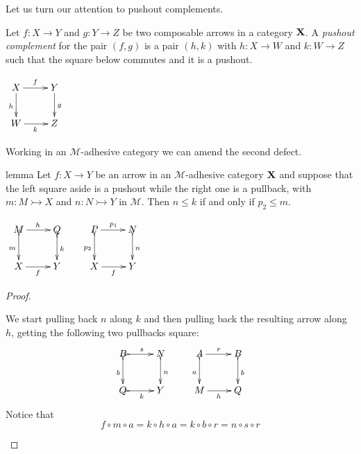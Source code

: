 \documentclass[a4paper,UKenglish,cleveref,pdftex, thm-restate,numberwithinsect]{lipics}
\newcommand{\id}[1]{\mathsf{id}_{#1}}
\def\X{\textbf {\textup{X}}}
\def\Set{\textbf {\textup{Set}}}
\begin{document}
{Let us turn our attention to pushout complements.

\noindent 
\parbox{11.7cm}{
\begin{definition}
Let $f\colon X\to Y$ and $g\colon Y\to Z$ be two composable arrows in a category $\X$. A \emph{pushout complement} for the pair $(f,g)$ is a pair $(h,k)$ with $h\colon X\to W$ and $k\colon W\to Z$ such that the square below commutes and it is a pushout.
\end{definition}} \quad 
\parbox{4cm}{\vspace{-.15cm}
	$\xymatrix{X \ar[r]^{f} \ar[d]_{h}& Y \ar[d]^{g} \\ W \ar[r]_{k}& Z}$}

\iffalse 
\begin{example}
	In a generic category $\X$, pushout complements may not exist: in $\Set$ the arrows $?_{2}\colon \emptyset \to 2$ and $!_2\colon 2\to 1$ do not have a pushout complement.
	
	Moreover, composable arrows $f\colon X\to Y$ and $g\colon Y\to Z$ may have  pushout complements which are non-isomorphic: for instance, in $\Set$ the two squares below are both pushouts.
	
	\[\xymatrix{2 \ar[r]^{!_2} \ar[d]_{\id{2}}& 1 \ar[d]^{\id{1}} & 2 \ar[r]^{!_2} \ar[d]_{!_2}& 1 \ar[d]^{\id{1}}\\ 2 \ar[r]_{!_2}& 1 & 1 \ar[r]_{\id{1}}& 1}\]
\end{example}
\fi 

Working in an $\mathcal{M}$-adhesive category we can amend the second defect. 

\noindent
\parbox{9cm}{
\begin{theoremEnd}[category=sec2]{lemma}\label{lem:radj}
Let $f\colon X \to Y$ be an arrow in an $\mathcal{M}$-adhesive category $\X$ and suppose that the left square aside is a pushout while the  right one is a pullback, with $ m\colon M \rightarrowtail X$ and $n\colon N \rightarrowtail Y$ in $\mathcal{M}$.
Then $n\leq k$ if and only if $p_2\leq m$.
\end{theoremEnd}}
\parbox{3cm}{\vspace{-0ex}
	$\xymatrix{M \ar@{>->}[d]_{m}\ar[r]^{h}& Q \ar@{>->}[d]^{k} & P \ar[r]^{p_1} \ar@{>->}[d]_{p_2}& N \ar@{>->}[d]^{n}\\X\ar[r]_{f}&Y &X \ar[r]_f&Y}$}

\begin{proof} 
\begin{proofEnd}  
	We start pulling back $n$ along $k$ and then pulling back the resulting arrow along $h$, getting the following two pullbacks square:
\[\xymatrix{B \ar@{>->}[d]_{b}\ar@{>->}[r]^{s}& N \ar@{>->}[d]^{n} & A \ar[r]^{r} \ar@{>->}[d]_{a}& B \ar@{>->}[d]^{b}\\Q\ar@{>->}[r]_{k}&Y &M \ar[r]_h&Q\\}\]
Notice that 
\[
f\circ m\circ a=k\circ h\circ a=k\circ b\circ r=n\circ s\circ r\]


\end{proofEnd}
\end{proof}}
\end{document}
